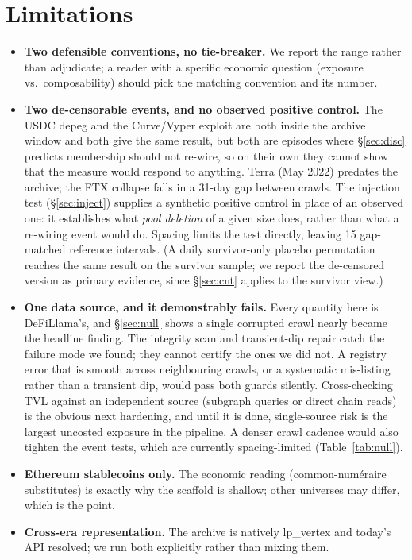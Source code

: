 \documentclass[10pt,twocolumn]{article}
\begin{document}
\section{Limitations}
\begin{itemize}
\item \textbf{Two defensible conventions, no tie-breaker.} We report the range rather than
adjudicate; a reader with a specific economic question (exposure vs.\ composability) should
pick the matching convention and its number.
\item \textbf{Two de-censorable events, and no observed positive control.} The USDC depeg
and the Curve/Vyper exploit are both inside the archive window and both give the same
result, but
both are episodes where \S\ref{sec:disc} predicts membership should not re-wire, so on
their own they cannot show that the measure would respond to anything. Terra (May 2022)
predates the archive; the FTX collapse falls in a 31-day gap between crawls. The injection
test (\S\ref{sec:inject}) supplies a synthetic positive control in place of an observed
one: it establishes what \emph{pool deletion} of a given size does, rather than what a
re-wiring event would do. Spacing limits the test directly, leaving 15
gap-matched reference intervals. (A daily survivor-only placebo permutation reaches the
same result on the survivor sample; we report the de-censored version as primary evidence,
since \S\ref{sec:cnt} applies to the survivor view.)
\item \textbf{One data source, and it demonstrably fails.} Every quantity here is
DeFiLlama's, and \S\ref{sec:null} shows a single corrupted crawl nearly became the
headline finding. The integrity scan and transient-dip repair catch the failure mode we
found; they cannot certify the ones we did not. A registry error that is smooth across
neighbouring crawls, or a systematic mis-listing rather than a transient dip, would pass
both guards silently. Cross-checking TVL against an independent source (subgraph queries
or direct chain reads) is the obvious next hardening, and until it is done, single-source
risk is the largest uncosted exposure in the pipeline. A denser crawl cadence would also
tighten the event tests, which are currently spacing-limited (Table~\ref{tab:null}).
\item \textbf{Ethereum stablecoins only.} The economic reading (common-numéraire
substitutes) is exactly why the scaffold is shallow; other universes may differ, which is
the point.
\item \textbf{Cross-era representation.} The archive is natively lp\_vertex and today's API
resolved; we run both explicitly rather than mixing them.
\end{itemize}
\end{document}
